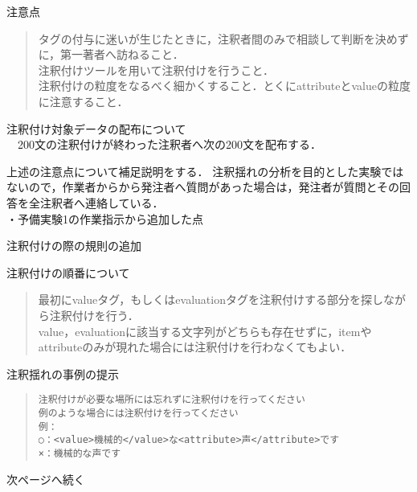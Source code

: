 \documentclass[japanese]{jnlp_1.4}
\begin{document}
\begin{screen}
注意点
\begin{quote}
タグの付与に迷いが生じたときに，注釈者間のみで相談して判断を決めずに，第一著者へ訪ねること．\\
注釈付けツールを用いて注釈付けを行うこと．\\
注釈付けの粒度をなるべく細かくすること．とくにattributeとvalueの粒度に注意すること．\\
\end{quote}
注釈付け対象データの配布について\\
　200文の注釈付けが終わった注釈者へ次の200文を配布する．
\end{screen}
上述の注意点について補足説明をする．
注釈揺れの分析を目的とした実験ではないので，作業者からから発注者へ質問があった場合は，発注者が質問とその回答を全注釈者へ連絡している．\\

・予備実験1の作業指示から追加した点
\begin{screen}
注釈付けの際の規則の追加
\begin{quote}
\end{quote}
注釈付けの順番について
\begin{quote}
最初にvalueタグ，もしくはevaluationタグを注釈付けする部分を探しながら注釈付けを行う．\\
value，evaluationに該当する文字列がどちらも存在せずに，itemやattributeのみが現れた場合には注釈付けを行わなくてもよい．
\end{quote}
注釈揺れの事例の提示
\begin{quote}
\begin{verbatim}
注釈付けが必要な場所には忘れずに注釈付けを行ってください
例のような場合には注釈付けを行ってください
例：
○：<value>機械的</value>な<attribute>声</attribute>です
×：機械的な声です
\end{verbatim}
\end{quote}
\end{screen}
次ページへ続く
\end{document}
